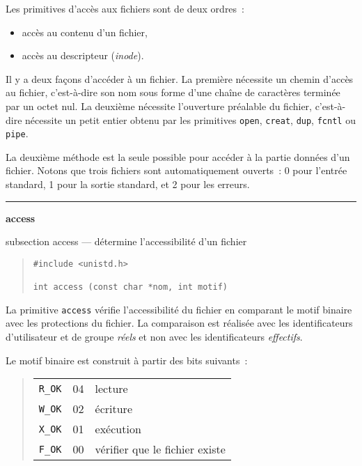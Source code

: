 \documentclass [twoside] {report}
\newcommand {\primitive} [1]
    {
	{\large \bf #1}
	\addcontentsline {toc} {subsection} {#1}
    }
\newcommand {\separation}
    {
	\vspace {7mm}
	\nopagebreak
	\hrule
    }
\begin{document}
Les primitives d'accès aux fichiers sont de deux
ordres~:
\begin {itemize}
    \item accès au contenu d'un fichier,
    \item accès au descripteur ({\it inode}).
\end {itemize}

Il y a deux façons d'accéder à un fichier. La première nécessite un
chemin d'accès au fichier, c'est-à-dire son nom sous forme d'une chaîne
de caractères terminée par un octet nul.  La deuxième nécessite
l'ouverture préalable du fichier, c'est-à-dire nécessite un petit
entier obtenu par les primitives {\tt open}, {\tt creat}, {\tt dup},
{\tt fcntl} ou {\tt pipe}.

La deuxième méthode est la seule possible pour
accéder à la partie données d'un fichier. Notons
que trois fichiers sont automatiquement ouverts~:
0 pour l'entrée standard, 1 pour la sortie
standard, et 2 pour les erreurs.





\separation
\primitive {access} --- détermine l'accessibilité d'un fichier

\begin {quote}
\begin {verbatim}
#include <unistd.h>

int access (const char *nom, int motif)
\end{verbatim}
\end {quote}

La primitive {\tt access} vérifie l'accessibilité
du fichier en comparant le motif binaire avec les
protections du fichier. La comparaison est
réalisée avec les identificateurs d'utilisateur et
de groupe {\it réels} et non avec les identificateurs
{\it effectifs}.

Le motif binaire est construit à partir des bits
suivants~:
\begin {quote}
    \begin {tabular} {|lll|} \hline
	\verb|R_OK| & 04 & lecture \\
	\verb|W_OK| & 02 & écriture \\
	\verb|X_OK| & 01 & exécution \\
	\verb|F_OK| & 00 & vérifier que le fichier existe \\ \hline
    \end {tabular}
\end {quote}
\end{document}
